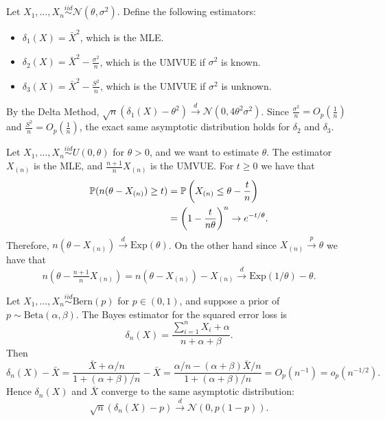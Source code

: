 \begin{example}
	Let $X_1, \dots, X_n \overset{iid}{\sim} \mathcal{N}(\theta, \sigma^2)$. Define the following estimators:
	\begin{itemize}
		\item $\delta_1(X) = \bar{X}^2$, which is the MLE.
		\item $\delta_2(X) = \bar{X}^2 - \frac{\sigma^2}{n}$, which is the UMVUE if $\sigma^2$ is known.
		\item $\delta_3(X) = \bar{X}^2 - \frac{S^2}{n}$, which is the UMVUE if $\sigma^2$ is unknown.
	\end{itemize}
	By the Delta Method, $\sqrt{n}(\delta_1(X) - \theta^2) \overset{d}{\to} \mathcal{N}(0, 4\theta^2\sigma^2)$. Since $\frac{\sigma^2}{n} = O_p(\frac{1}{n})$ and $\frac{S^2}{n} = O_p(\frac{1}{n})$, the exact same asymptotic distribution holds for $\delta_2$ and $\delta_3$.
\end{example}

\begin{example}
	Let $X_1, \dots, X_n \overset{iid}{\sim} U(0, \theta)$ for $\theta > 0$, and we want to estimate $\theta$. The estimator $X_{(n)}$ is the MLE, and $\frac{n+1}{n}X_{(n)}$ is the UMVUE. For $t \ge 0$ we have that \begin{align*}
		\mathbb{P}(n(\theta - X_{(n)}) \geq t) &= \mathbb{P}\left(X_{(n)} \leq \theta - \frac{t}{n}\right) \\
		&= \left(1 - \frac{t}{n\theta}\right)^n \to e^{-t/\theta}.
	\end{align*}
	Therefore, $n(\theta - X_{(n)}) \overset{d}{\to} \text{Exp}(\theta)$. On the other hand since $X_{(n)} \overset{p}{\to} \theta$ we have that \[
		n\left(\theta - \tfrac{n+1}{n}X_{(n)}\right) = n(\theta - X_{(n)}) - X_{(n)} \overset{d}{\to} \text{Exp}(1/\theta) - \theta.
	\]
\end{example}

\begin{example}
	Let $X_1, \dots, X_n \overset{iid}{\sim} \text{Bern}(p)$ for $p \in (0,1)$, and suppose a prior of $p \sim \text{Beta}(\alpha, \beta)$. The Bayes estimator for the squared error loss is \[
	\delta_n(X) = \frac{\sum_{i=1}^n X_i + \alpha}{n + \alpha + \beta}.
	\] Then \[
	\delta_n(X) - \bar{X} = \frac{\bar{X} + \alpha/n}{1 + (\alpha+\beta)/n} - \bar{X} = \frac{\alpha/n - (\alpha+\beta) \bar{X} /n}{1 + (\alpha+\beta)/n} = O_p\left(n^{-1}\right) = o_p(n^{-1/2}).
	\] Hence $\delta_n(X)$ and $\bar X$ converge to the same asymptotic distribution: $$\sqrt{n}(\delta_n(X) - p) \overset{d}{\to} \mathcal{N}(0, p(1-p)).$$
\end{example}




